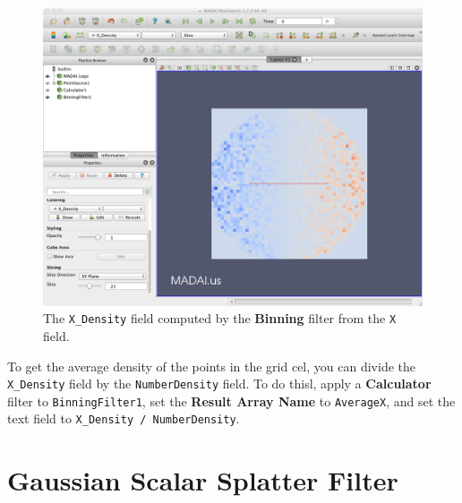 \documentclass[12pt]{article}
\begin{document}
\begin{figure}[htbp]
   \centering
   \includegraphics[scale=.25]{images/BinningFilter_XDensity.png} %
   \caption{The \texttt{X\_Density} field computed by the \textbf{Binning} filter from the \texttt{X} field.}
   \label{fig:BinningFilterXDensity}
\end{figure}

To get the average density of the points in the grid cel, you can divide the \texttt{X\_Density} field by the \texttt{NumberDensity} field. To do thisl, apply a \textbf{Calculator} filter to \texttt{BinningFilter1}, set the \textbf{Result Array Name} to \texttt{AverageX}, and set the text field to \texttt{X\_Density / NumberDensity}. 

\section{Gaussian Scalar Splatter Filter}

\section{}



\end{document}
